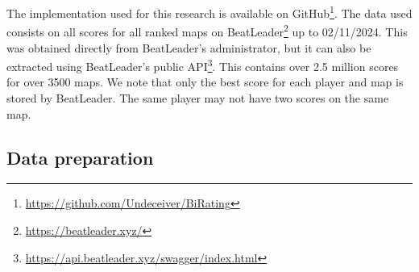 \documentclass[12pt,a4paper]{article}
\begin{document}
The implementation used for this research is available on GitHub\footnote{\url{https://github.com/Undeceiver/BiRating}}. The data used consists on all scores for all ranked maps on BeatLeader\footnote{\url{https://beatleader.xyz/}} up to 02/11/2024. This was obtained directly from BeatLeader's administrator, but it can also be extracted using BeatLeader's public API\footnote{\url{https://api.beatleader.xyz/swagger/index.html}}. This contains over 2.5 million scores for over 3500 maps. We note that only the best score for each player and map is stored by BeatLeader. The same player may not have two scores on the same map.\\

\subsection{Data preparation}
\label{data_preparation}
\end{document}
